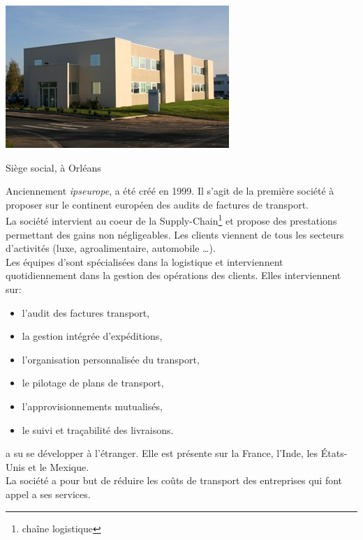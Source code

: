 
\mysection{\interlog}

	\begin{photo}[!h]
		\centering
		\includegraphics[scale=0.5]{./images/siege_interlog.jpg}
		\caption{Siège social, \interlog à Orléans}
	\end{photo}

		Anciennement \textit{ipseurope}, \interlog a été créé en 1999. Il s'agit de la première société à proposer sur le continent européen des audits de factures de transport.\\

		La société intervient au coeur de la \og Supply-Chain\fg \footnote{chaîne logistique}  et propose des prestations permettant des gains non négligeables. Les clients viennent de tous les secteurs d'activités (luxe, agroalimentaire, automobile \ldots).  \\

		Les équipes d'\interlog sont spécialisées dans la logistique et interviennent quotidiennement dans la gestion des opérations des clients. Elles interviennent sur:
		\begin{itemize}
			\item l'audit des factures transport,
			\item la gestion intégrée d’expéditions,
			\item l'organisation personnalisée du transport,
			\item le pilotage de plans de transport,
			\item l'approvisionnements mutualisés,
			\item le suivi et traçabilité des livraisons.
		\end{itemize}	
		
		\interlog  a su se développer à l'étranger. Elle est présente sur la France, l'Inde, les États-Unis et le Mexique.\\
		
		La société a pour but de réduire les coûts de transport des entreprises qui font appel a ses services.

    

    
    
    
   
